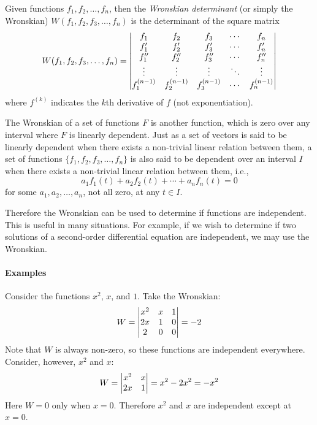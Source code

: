 \documentclass[12pt]{article}
\begin{document}
Given functions $f_1, f_2, \dotsc, f_n$, then the \emph{Wronskian determinant} (or simply the Wronskian) $W(f_1, f_2, f_3, \dotsc, f_n)$ is the determinant of the square matrix
\[
W(f_1, f_2, f_3, \dotsc, f_n) = \left\lvert\begin{array}{@{}ccccc@{}}
f_1 & f_2 & f_3 & \cdots & f_n\\
f_1' & f_2' & f_3' & \cdots & f_n'\\
f_1'' & f_2'' & f_3'' & \cdots & f_n''\\
\vdots & \vdots & \vdots & \ddots & \vdots\\
f_1^{(n-1)} & f_2^{(n-1)} & f_3^{(n-1)} & \cdots & f_n^{(n-1)}\\
\end{array}\right\rvert
\]
where $f^{(k)}$ indicates the $k$th derivative of $f$ (not exponentiation).

The Wronskian of a set of functions $F$ is another function, which is zero over any interval where $F$ is linearly dependent. Just as a set of vectors is said to be linearly dependent when there exists a non-trivial linear relation between them, a set of functions $\{f_1, f_2, f_3, \dotsc, f_n\}$ is also said to be dependent over an interval $I$ when there exists a non-trivial linear relation between them, i.e.,
\[
a_1 f_1(t) + a_2 f_2(t) + \dotsb + a_n f_n(t) = 0
\]
for some $a_1, a_2, \dotsc, a_n$, not all zero, at any $t \in I$.

Therefore the Wronskian can be used to determine if functions are independent. This is useful in many situations. For example, if we wish to determine if two solutions of a second-order differential equation are independent, we may use the Wronskian.

\paragraph{Examples}

Consider the functions $x^2$, $x$, and $1$. Take the Wronskian:
\[
W = \left\lvert\begin{array}{@{}ccc@{}}
x^2 & x & 1\\
2x & 1 & 0\\
2 & 0 & 0\\
\end{array}\right\rvert = -2
\]
Note that $W$ is always non-zero, so these functions are independent everywhere. Consider, however, $x^2$ and $x$:
\[
W = \left\lvert\begin{array}{@{}cc@{}}
x^2 & x\\
2x & 1\\
\end{array}\right\rvert = x^2 - 2x^2 = -x^2
\]
Here $W = 0$ only when $x = 0$. Therefore $x^2$ and $x$ are independent except at $x = 0$.
\end{document}
